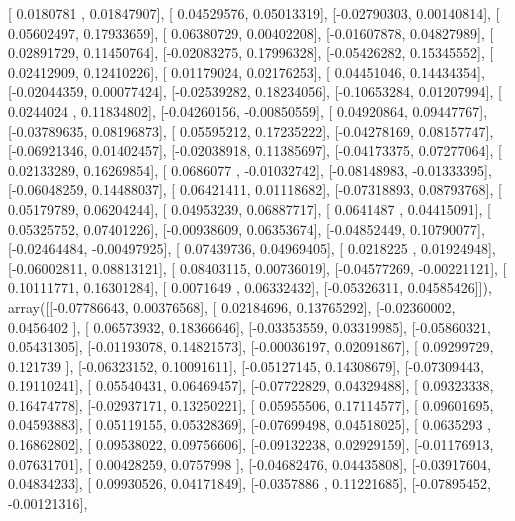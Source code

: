 \documentclass{article}
\begin{document}
       [ 0.0180781 ,  0.01847907],
       [ 0.04529576,  0.05013319],
       [-0.02790303,  0.00140814],
       [ 0.05602497,  0.17933659],
       [ 0.06380729,  0.00402208],
       [-0.01607878,  0.04827989],
       [ 0.02891729,  0.11450764],
       [-0.02083275,  0.17996328],
       [-0.05426282,  0.15345552],
       [ 0.02412909,  0.12410226],
       [ 0.01179024,  0.02176253],
       [ 0.04451046,  0.14434354],
       [-0.02044359,  0.00077424],
       [-0.02539282,  0.18234056],
       [-0.10653284,  0.01207994],
       [ 0.0244024 ,  0.11834802],
       [-0.04260156, -0.00850559],
       [ 0.04920864,  0.09447767],
       [-0.03789635,  0.08196873],
       [ 0.05595212,  0.17235222],
       [-0.04278169,  0.08157747],
       [-0.06921346,  0.01402457],
       [-0.02038918,  0.11385697],
       [-0.04173375,  0.07277064],
       [ 0.02133289,  0.16269854],
       [ 0.0686077 , -0.01032742],
       [-0.08148983, -0.01333395],
       [-0.06048259,  0.14488037],
       [ 0.06421411,  0.01118682],
       [-0.07318893,  0.08793768],
       [ 0.05179789,  0.06204244],
       [ 0.04953239,  0.06887717],
       [ 0.0641487 ,  0.04415091],
       [ 0.05325752,  0.07401226],
       [-0.00938609,  0.06353674],
       [-0.04852449,  0.10790077],
       [-0.02464484, -0.00497925],
       [ 0.07439736,  0.04969405],
       [ 0.0218225 ,  0.01924948],
       [-0.06002811,  0.08813121],
       [ 0.08403115,  0.00736019],
       [-0.04577269, -0.00221121],
       [ 0.10111771,  0.16301284],
       [ 0.0071649 ,  0.06332432],
       [-0.05326311,  0.04585426]]), array([[-0.07786643,  0.00376568],
       [ 0.02184696,  0.13765292],
       [-0.02360002,  0.0456402 ],
       [ 0.06573932,  0.18366646],
       [-0.03353559,  0.03319985],
       [-0.05860321,  0.05431305],
       [-0.01193078,  0.14821573],
       [-0.00036197,  0.02091867],
       [ 0.09299729,  0.121739  ],
       [-0.06323152,  0.10091611],
       [-0.05127145,  0.14308679],
       [-0.07309443,  0.19110241],
       [ 0.05540431,  0.06469457],
       [-0.07722829,  0.04329488],
       [ 0.09323338,  0.16474778],
       [-0.02937171,  0.13250221],
       [ 0.05955506,  0.17114577],
       [ 0.09601695,  0.04593883],
       [ 0.05119155,  0.05328369],
       [-0.07699498,  0.04518025],
       [ 0.0635293 ,  0.16862802],
       [ 0.09538022,  0.09756606],
       [-0.09132238,  0.02929159],
       [-0.01176913,  0.07631701],
       [ 0.00428259,  0.0757998 ],
       [-0.04682476,  0.04435808],
       [-0.03917604,  0.04834233],
       [ 0.09930526,  0.04171849],
       [-0.0357886 ,  0.11221685],
       [-0.07895452, -0.00121316],
\end{document}

